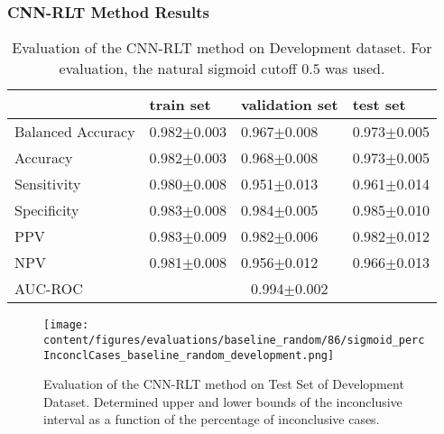 \subsubsection{CNN-RLT Method Results}
\label{subsubsec:eval_rlt}





\begin{table}[ht]
  \caption{Evaluation of the CNN-RLT method on Development dataset. 
  For evaluation, the natural sigmoid cutoff $0.5$ was used.}
  \centering
  \begin{tabular}{llll}
      \hline
                        & train set         & validation set      & test set             \\
      \hline
      Balanced Accuracy & 0.982$\pm$0.003   &  0.967$\pm$0.008    &  0.973$\pm$0.005  \\
      Accuracy          & 0.982$\pm$0.003    &   0.968$\pm$0.008   &  0.973$\pm$0.005  \\
      Sensitivity       &  0.980$\pm$0.008  &   0.951$\pm$0.013  &  0.961$\pm$0.014 \\
      Specificity       &   0.983$\pm$0.008   &   0.984$\pm$0.005  &   0.985$\pm$0.010 \\
      PPV               &  0.983$\pm$0.009   &   0.982$\pm$0.006   &  0.982$\pm$0.012   \\
      NPV               &  0.981$\pm$0.008   &   0.956$\pm$0.012   & 0.966$\pm$0.013  \\
      \hline
      AUC-ROC          &  \multicolumn{3}{c}{0.994$\pm$0.002}  \\
      \hline
  \end{tabular}
 \label{t1:cnn_rlt_perf_eval_table}
\end{table}


\begin{figure}[t]
  \centering
  \texttt{[image: content/figures/evaluations/baseline\_random/86/sigmoid\_percInconclCases\_baseline\_random\_development.png]}
  \caption{Evaluation of the CNN-RLT method on Test Set of Development Dataset. 
  Determined upper and lower bounds of the inconclusive interval as a function of the percentage of inconclusive cases.} 
  \label{fig:baseline_random_percInconclCases_development}
\end{figure}


